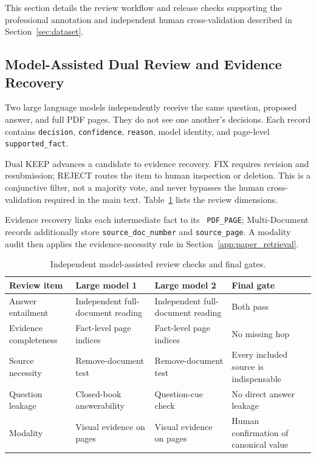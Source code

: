\documentclass{article} %
\begin{document}
This section details the review workflow and release checks supporting the professional annotation and independent human cross-validation described in Section~\ref{sec:dataset}.

\subsection{Model-Assisted Dual Review and Evidence Recovery}
\label{app:dual_review}

Two large language models independently receive the same question, proposed answer, and full PDF pages. They do not see one another's decisions. Each record contains \texttt{decision}, \texttt{confidence}, \texttt{reason}, model identity, and page-level \texttt{supported\_\allowbreak fact}.

Dual KEEP advances a candidate to evidence recovery. FIX requires revision and resubmission; REJECT routes the item to human inspection or deletion. This is a conjunctive filter, not a majority vote, and never bypasses the human cross-validation required in the main text. Table~\ref{tab:app_dual_review} lists the review dimensions.

Evidence recovery links each intermediate fact to its \texttt{ PDF\_\allowbreak PAGE}; Multi-Document records additionally store \texttt{source\_\allowbreak doc\_\allowbreak number} and \texttt{source\_\allowbreak page}. A modality audit then applies the evidence-necessity rule in Section~\ref{app:paper_retrieval}.

\begin{table}[!htb]
\centering
\caption{Independent model-assisted review checks and final gates.}
\label{tab:app_dual_review}
\small
\begin{tabularx}{\linewidth}{l X X X}
\toprule
\textbf{Review item} & \textbf{Large model 1} & \textbf{Large model 2} & \textbf{Final gate} \\
\midrule
Answer entailment & Independent full-document reading & Independent full-document reading & Both pass \\
Evidence completeness & Fact-level page indices & Fact-level page indices & No missing hop \\
Source necessity & Remove-document test & Remove-document test & Every included source is indispensable \\
Question leakage & Closed-book answerability & Question-cue check & No direct answer leakage \\
Modality & Visual evidence on pages & Visual evidence on pages & Human confirmation of canonical value \\
\bottomrule
\end{tabularx}
\end{table}
\end{document}
